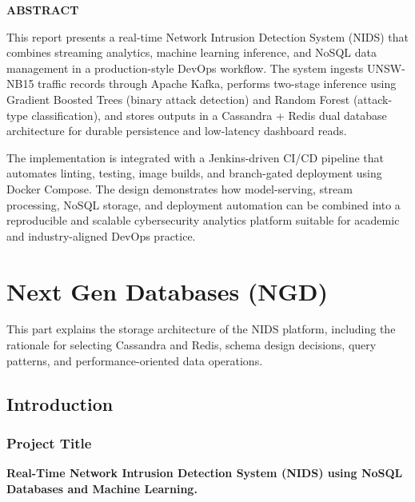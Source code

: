 \documentclass[12pt,a4paper]{report}
\begin{document}
\tableofcontents
\newpage
\listoffigures
\newpage
\listoftables
\newpage

\thispagestyle{plain}
\begin{center}
  \textbf{\Large ABSTRACT}
\end{center}
\vspace{0.5cm}

This report presents a real-time Network Intrusion Detection System (NIDS)
that combines streaming analytics, machine learning inference, and NoSQL data
management in a production-style DevOps workflow. The system ingests
UNSW-NB15 traffic records through Apache Kafka, performs two-stage inference
using Gradient Boosted Trees (binary attack detection) and Random Forest
(attack-type classification), and stores outputs in a Cassandra + Redis dual
database architecture for durable persistence and low-latency dashboard reads.

The implementation is integrated with a Jenkins-driven CI/CD pipeline that
automates linting, testing, image builds, and branch-gated deployment using
Docker Compose. The design demonstrates how model-serving, stream processing,
NoSQL storage, and deployment automation can be combined into a reproducible
and scalable cybersecurity analytics platform suitable for academic and
industry-aligned DevOps practice.
\newpage

\part{Next Gen Databases (NGD)}
This part explains the storage architecture of the NIDS platform, including
the rationale for selecting Cassandra and Redis, schema design decisions,
query patterns, and performance-oriented data operations.

\chapter{Introduction}

\section{Project Title}
\textbf{Real-Time Network Intrusion Detection System (NIDS) using NoSQL
Databases and Machine Learning.}
\end{document}
